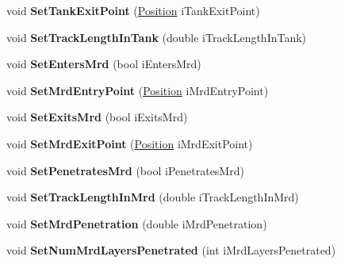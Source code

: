 \begin{DoxyCompactItemize}
\item 
\hypertarget{classMCParticle_a1cbf3a6c05ac82ec5e9c8b90a70c2940}{void {\bfseries Set\-Tank\-Exit\-Point} (\hyperlink{classPosition}{Position} i\-Tank\-Exit\-Point)}\label{classMCParticle_a1cbf3a6c05ac82ec5e9c8b90a70c2940}

\item 
\hypertarget{classMCParticle_a7ca9800559d1e4fddd3fc98c0deb2c99}{void {\bfseries Set\-Track\-Length\-In\-Tank} (double i\-Track\-Length\-In\-Tank)}\label{classMCParticle_a7ca9800559d1e4fddd3fc98c0deb2c99}

\item 
\hypertarget{classMCParticle_a0538d9cb8cf49a824f3fd77d0531e935}{void {\bfseries Set\-Enters\-Mrd} (bool i\-Enters\-Mrd)}\label{classMCParticle_a0538d9cb8cf49a824f3fd77d0531e935}

\item 
\hypertarget{classMCParticle_a5ac43b6d4e343123b0308aeff287a1ec}{void {\bfseries Set\-Mrd\-Entry\-Point} (\hyperlink{classPosition}{Position} i\-Mrd\-Entry\-Point)}\label{classMCParticle_a5ac43b6d4e343123b0308aeff287a1ec}

\item 
\hypertarget{classMCParticle_ad11395d2bd739fc1ad5d473f6313a34a}{void {\bfseries Set\-Exits\-Mrd} (bool i\-Exits\-Mrd)}\label{classMCParticle_ad11395d2bd739fc1ad5d473f6313a34a}

\item 
\hypertarget{classMCParticle_a775d17a50fd84cd07f9049aff86f0ead}{void {\bfseries Set\-Mrd\-Exit\-Point} (\hyperlink{classPosition}{Position} i\-Mrd\-Exit\-Point)}\label{classMCParticle_a775d17a50fd84cd07f9049aff86f0ead}

\item 
\hypertarget{classMCParticle_ab112ca1f301435bb933ba813d7a4da3e}{void {\bfseries Set\-Penetrates\-Mrd} (bool i\-Penetrates\-Mrd)}\label{classMCParticle_ab112ca1f301435bb933ba813d7a4da3e}

\item 
\hypertarget{classMCParticle_af85b13f2164e52e752d6e14534d4b31c}{void {\bfseries Set\-Track\-Length\-In\-Mrd} (double i\-Track\-Length\-In\-Mrd)}\label{classMCParticle_af85b13f2164e52e752d6e14534d4b31c}

\item 
\hypertarget{classMCParticle_a1bd0d632655c48ee8bc311b7ab9c3996}{void {\bfseries Set\-Mrd\-Penetration} (double i\-Mrd\-Penetration)}\label{classMCParticle_a1bd0d632655c48ee8bc311b7ab9c3996}

\item 
\hypertarget{classMCParticle_abc4ac222c79d03dd421dccf1c27aa461}{void {\bfseries Set\-Num\-Mrd\-Layers\-Penetrated} (int i\-Mrd\-Layers\-Penetrated)}\label{classMCParticle_abc4ac222c79d03dd421dccf1c27aa461}


\end{DoxyCompactItemize}
